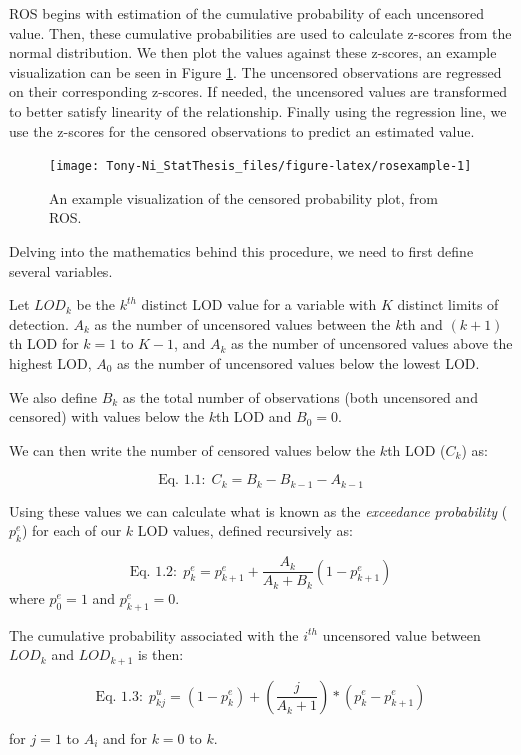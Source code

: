 \documentclass[12pt, twoside]{amherstthesis}
\begin{document}
ROS begins with estimation of the cumulative probability of each uncensored value. Then, these cumulative probabilities are used to calculate z-scores from the normal distribution. We then plot the values against these z-scores, an example visualization can be seen in Figure \ref{fig:rosexample}. The uncensored observations are regressed on their corresponding z-scores. If needed, the uncensored values are transformed to better satisfy linearity of the relationship. Finally using the regression line, we use the z-scores for the censored observations to predict an estimated value.
\begin{figure}

{\centering \texttt{[image: Tony-Ni\_StatThesis\_files/figure-latex/rosexample-1]} 

}

\caption{An example visualization of the censored probability plot, from ROS.}\label{fig:rosexample}
\end{figure}
Delving into the mathematics behind this procedure, we need to first define several variables.

Let \(LOD_k\) be the \(k^{th}\) distinct LOD value for a variable with \(K\) distinct limits of detection. \(A_k\) as the number of uncensored values between the \(k\)th and \((k+1)\)th LOD for \(k=1\) to \(K-1\), and \(A_k\) as the number of uncensored values above the highest LOD, \(A_0\) as the number of uncensored values below the lowest LOD.

We also define \(B_k\) as the total number of observations (both uncensored and censored) with values below the \(k\)th LOD and \(B_0 = 0\).

We can then write the number of censored values below the \(k\)th LOD (\(C_k\)) as:

\[\textrm{Eq. 1.1:} \ \  C_k = B_k - B_{k-1}-A_{k-1}\]

Using these values we can calculate what is known as the \emph{exceedance probability} (\(p^e_{k}\)) for each of our \(k\) LOD values, defined recursively as:

\[\textrm{Eq. 1.2:} \ \  p^e_k = p^e_{k+1} + \frac{A_k}{A_k+B_k}(1 - p^e_{k+1})\]
where \(p^e_0 = 1\) and \(p^e_{k+1} = 0\).

The cumulative probability associated with the \(i^{th}\) uncensored value between \(LOD_k\) and \(LOD_{k+1}\) is then:

\[\textrm{Eq. 1.3:} \ \  p^u_{kj} = (1-p^e_k)+ \left(\frac{j}{A_k+1}\right)*(p^e_k-p^e_{k+1})\]

for \(j = 1\) to \(A_i\) and for \(k = 0\) to \(k\).
\end{document}
